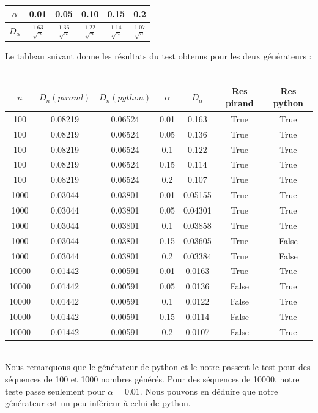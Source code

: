\documentclass[10pt,a4paper]{article}
\begin{document}
\begin{center}
\begin{tabular}{|c|c|c|c|c|c|}
\hline
$\alpha$ &0.01& 0.05& 0.10& 0.15& 0.2\\
\hline
$D_\alpha$ & $\frac{1.63}{\sqrt{n}}$ & $\frac{1.36}{\sqrt{n}}$ & $\frac{1.22}{\sqrt{n}}$ & $\frac{1.14}{\sqrt{n}}$ & $\frac{1.07}{\sqrt{n}}$\\
\hline
\end{tabular}
\end{center}
Le tableau suivant donne les résultats du test obtenus pour les deux générateurs : \\\\
\begin{tabular}{|c|c|c|c|c|c|c|}
\hline
 $n$ & $D_{n} (pirand)$ & $D_{n} (python)$ & $\alpha$ & $D_{\alpha}$ & Res pirand & Res python\\ 
\hline 
100&0.08219&0.06524 & 0.01&0.163 & True & True\\\hline 
100&0.08219&0.06524 & 0.05&0.136 & True & True\\\hline 
100&0.08219&0.06524 & 0.1&0.122 & True & True\\\hline 
100&0.08219&0.06524 & 0.15&0.114 & True & True\\\hline 
100&0.08219&0.06524 & 0.2&0.107 & True & True\\\hline 
1000&0.03044&0.03801 & 0.01&0.05155 & True & True\\\hline 
1000&0.03044&0.03801 & 0.05&0.04301 & True & True\\\hline 
1000&0.03044&0.03801 & 0.1&0.03858 & True & True\\\hline 
1000&0.03044&0.03801 & 0.15&0.03605 & True & False\\\hline 
1000&0.03044&0.03801 & 0.2&0.03384 & True & False\\\hline 
10000&0.01442&0.00591 & 0.01&0.0163 & True & True\\\hline 
10000&0.01442&0.00591 & 0.05&0.0136 & False & True\\\hline 
10000&0.01442&0.00591 & 0.1&0.0122 & False & True\\\hline 
10000&0.01442&0.00591 & 0.15&0.0114 & False & True\\\hline 
10000&0.01442&0.00591 & 0.2&0.0107 & False & True\\\hline
\end{tabular}\\
\newline 
Nous remarquons que le générateur de python et le notre passent le test pour des séquences de 100 et 1000 nombres générés. Pour des séquences de 10000, notre teste passe seulement pour $\alpha = 0.01$. Nous pouvons en déduire que notre générateur est un peu inférieur à celui de python.
\end{document}
